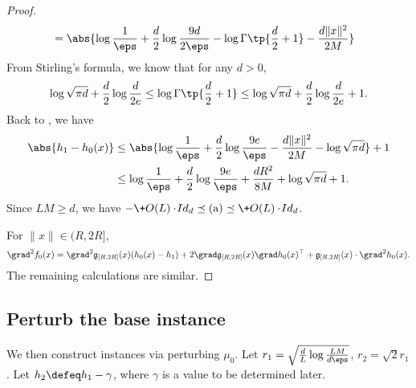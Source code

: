 \begin{proof}
\begin{align}
        &= \abs{\log \frac{1}{\eps} + \frac{d}{2}\log\frac{9d}{2\eps} - \log \Gamma\tp{\frac{d}{2}+1} - \frac{d\|x\|^2}{2M}} \label{eq:1}
    \end{align}
    From Stirling's formula, we know that for any $d>0$,
    \[
        \log\sqrt{\pi d} + \frac{d}{2}\log \frac{d}{2e} \leq \log \Gamma\tp{\frac{d}{2}+1}\leq \log\sqrt{\pi d} + \frac{d}{2}\log \frac{d}{2e} + 1.
    \]
    Back to , we have
    \begin{align*}
        \abs{h_1 - h_0(x)}&\leq \abs{\log \frac{1}{\eps} + \frac{d}{2}\log\frac{9e}{\eps} - \frac{d\|x\|^2}{2M} -\log\sqrt{\pi d}} + 1 \\
        &\leq \log \frac{1}{\eps} + \frac{d}{2}\log\frac{9e}{\eps} + \frac{dR^2}{8M} + \log\sqrt{\pi d} +1.
    \end{align*}
    Since $LM\geq d$, we have $-\+O(L)\cdot\!{Id}_d \preceq \mbox{(a)}\preceq \+O(L)\cdot\!{Id}_d$.
    
    For $\|x\|\in (R,2R]$, 
    \[
        \grad^2 f_0(x) = \grad^2 \mathfrak{g}_{[R,2R]}(x)(h_0(x)-h_1) + 2\grad \mathfrak{g}_{[R,2R]}(x) \grad h_0(x)^{\top} + \mathfrak{g}_{[R,2R]}(x) \cdot \grad^2 h_0(x).
    \]
    The remaining calculations are similar. %
\end{proof}


\subsection{Perturb the base instance}\label{sec:hardinstance}
We then construct instances via perturbing $\mu_0$. Let $r_1= \sqrt{\frac{d}{L}\log \frac{LM}{d\eps}}$, $r_2=\sqrt{2}r_1$. Let $h_2\defeq h_1 - \gamma$, where $\gamma$ is a value to be determined later.

